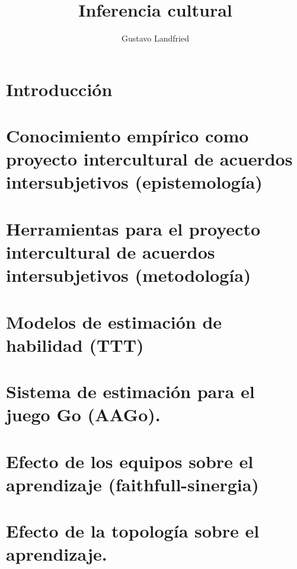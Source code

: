 \documentclass[a4paper,10pt]{book}
\title{\huge Inferencia cultural}
\author{Gustavo Landfried}
\begin{document}
\maketitle

\tableofcontents

\chapter{Introducción}

\chapter{Conocimiento empírico como proyecto intercultural de acuerdos intersubjetivos (epistemología)}

\chapter{Herramientas para el proyecto intercultural de acuerdos intersubjetivos (metodología)}

\chapter{Modelos de estimación de habilidad (TTT)}

\chapter{Sistema de estimación para el juego Go (AAGo).}

\chapter{Efecto de los equipos sobre el aprendizaje (faithfull-sinergia)}

\chapter{Efecto de la topología sobre el aprendizaje.}
\end{document}
